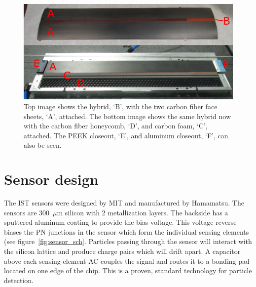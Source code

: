 \documentclass[preprint,12pt]{elsarticle}
\begin{document}
\begin{figure}[h]
\begin{center}
\includegraphics[width=5.5in, keepaspectratio=true, angle=0]{graphics/stave_assmb.png}
\caption{Top image shows the hybrid, `B', with the two carbon fiber face sheets, `A', attached.
The bottom image shows the same hybrid now with the carbon fiber honeycomb, `D', and 
carbon foam, `C', attached. The PEEK closeout, `E', and aluminum closeout, `F', can also be seen.
\label{fig:stave_assmb}}
\end{center}
\end{figure}
%
\section{Sensor design}
The IST sensors were designed by MIT and
manufactured by Hamamatsu. The sensors are 300~$\mu$m silicon with 2 metallization
layers. The backside has a sputtered aluminum coating to provide the bias voltage.
This voltage reverse biases the PN junctions in the sensor which form the individual
sensing elements (see figure~\ref{fig:sensor_sch}. Particles passing through the sensor will interact
with the silicon lattice and produce charge pairs which will drift apart. A capacitor
above each sensing element AC couples the signal and routes it to a bonding pad
located on one edge of the chip. This is a proven, standard technology for
particle detection.
\end{document}
